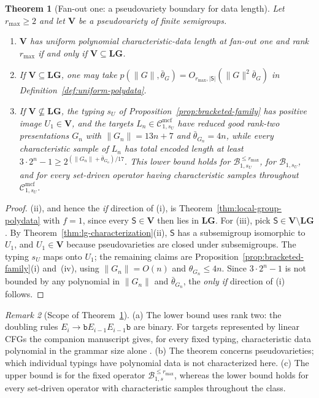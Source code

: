 \documentclass[11pt]{article}
\numberwithin{equation}{section}
\theoremstyle{plain}
\newtheorem{theorem}{Theorem}[section]
\theoremstyle{definition}
\theoremstyle{remark}
\newtheorem{remark}[theorem]{Remark}
\newcommand{\Cmcf}[2]{\mathcal{C}^{\mathrm{mcf}}_{#1,#2}}
\theoremstyle{plain}
\begin{document}
\begin{theorem}[Fan-out one: a pseudovariety boundary for data length]
\label{thm:fanout-one-data}
Let $r_{\max}\ge2$ and let $\mathbf V$ be a pseudovariety of finite
semigroups.
\begin{enumerate}[label=\textup{(\roman*)},leftmargin=*]
\item $\mathbf V$ has uniform polynomial characteristic-data length at
fan-out one and rank $r_{\max}$ if and only if
$\mathbf V\subseteq\mathbf{LG}$.
\item If $\mathbf V\subseteq\mathbf{LG}$, one may take
$p(\|G\|,\bar\theta_G)=O_{r_{\max},|\mathsf S|}(\|G\|^2\bar\theta_G)$ in
Definition~\ref{def:uniform-polydata}.
\item If $\mathbf V\not\subseteq\mathbf{LG}$, the typing $s_U$ of
Proposition~\ref{prop:bracketed-family} has positive image
$U_1\in\mathbf V$, and the targets $L_n\in\Cmcf{1}{s_U}$ have reduced good
rank-two presentations $G_n$ with $\|G_n\|=13n+7$ and
$\bar\theta_{G_n}=4n$, while every characteristic sample of $L_n$ has
total encoded length at least
$3\cdot2^n-1\ge2^{(\|G_n\|+\bar\theta_{G_n})/17}$.  This lower bound holds for
$\mathcal B^{\le r_{\max}}_{1,s_U}$, for $\mathcal B_{1,s_U}$, and for every
set-driven operator having characteristic samples throughout
$\Cmcf{1}{s_U}$.
\end{enumerate}
\end{theorem}

\begin{proof}
(ii), and hence the \emph{if} direction of (i), is
Theorem~\ref{thm:local-group-polydata} with $f=1$, since every
$\mathsf S\in\mathbf V$ then lies in $\mathbf{LG}$.  For (iii), pick
$\mathsf S\in\mathbf V\setminus\mathbf{LG}$.  By
Theorem~\ref{thm:lg-characterization}(ii), $\mathsf S$ has a subsemigroup
isomorphic to $U_1$, and $U_1\in\mathbf V$ because pseudovarieties are
closed under subsemigroups.  The typing $s_U$ maps onto $U_1$; the
remaining claims are Proposition~\ref{prop:bracketed-family}(i) and~(iv),
using $\|G_n\|=O(n)$ and $\theta_{G_n}\le4n$.  Since
$3\cdot2^n-1$ is not bounded by any polynomial in $\|G_n\|$ and
$\bar\theta_{G_n}$, the \emph{only if} direction of (i) follows.
\end{proof}

\begin{remark}[Scope of Theorem~\ref{thm:fanout-one-data}]
\label{rem:fanout-one-data}
(a) The lower bound uses rank two: the doubling rules
$E_i\to\mathtt bE_{i-1}E_{i-1}\mathtt b$ are binary.  For targets represented by
linear CFGs the companion manuscript gives, for every fixed typing,
characteristic data polynomial in the grammar size alone
\cite[Theorem~8.3]{kuriyamaCFG}.
(b) The theorem concerns pseudovarieties; which individual typings have
polynomial data is not characterized here.
(c) The upper bound is for the fixed operator
$\mathcal B^{\le r_{\max}}_{1,s}$, whereas the lower bound holds for every
set-driven operator with characteristic samples throughout the class.
\end{remark}
\end{document}
